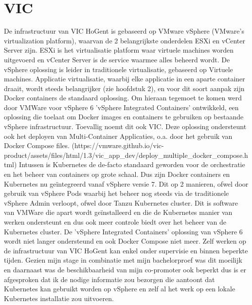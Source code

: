 \section{VIC}

De infrastructuur van VIC HoGent is gebaseerd op VMware vSphere (VMware's virtualization platform), waarvan de 2 belangrijkste onderdelen ESXi en vCenter Server zijn. ESXi is het virtualisatie platform waar virtuele machines worden uitgevoerd en vCenter Server is de service waarmee alles beheerd wordt.
\newline
\newline
De vSphere oplossing is leider in traditionele virtualisatie, gebaseerd op Virtuele machines. Applicatie virtualisatie, waarbij elke applicatie in een aparte container draait, wordt steeds belangrijker (zie hoofdstuk 2), en voor dit soort aanpak zijn Docker containers de standaard oplossing.
\newline
\newline
Om hieraan tegemoet te komen werd door VMWare voor vSphere 6 'vSphere Integrated Containers' ontwikkeld, een oplossing die toelaat om Docker images en containers te gebruiken op bestaande vSphere infrastructuur. Toevallig noemt dit ook VIC.
Deze oplossing ondersteunt ook het deployen van Multi-Container Applicaties, o.a. door het gebruik van Docker Compose files. (https://vmware.github.io/vic-product/assets/files/html/1.3/vic\_app\_dev/deploy\_multiple\_docker\_compose.html)
\newline
\newline
Intussen is Kubernetes de de-facto standaard geworden voor de orchestratie en het beheer van containers op grote schaal.
\newline
\newline
Dus zijn Docker containers en Kubernetes nu geïntegreerd vanaf vSphere versie 7. Dit op 2 manieren, ofwel door gebruik van vSphere Pods waarbij het beheer nog steeds via de traditionele vSphere Admin verloopt, ofwel door Tanzu Kubernetes cluster. Dit is software van VMWare die apart wordt geïnstalleerd en die de Kubernetes manier van werken ondersteunt en dus ook meer controle biedt over het beheer van de Kubernetes cluster.
De 'vSphere Integrated Containers' oplossing van vSphere 6 wordt niet langer ondersteund en ook Docker Compose niet meer.
\newline
\newline
Zelf werken op de infrastructuur van VIC HoGent kan enkel onder supervisie en binnen beperkte tijden. Gezien mijn stage in combinatie met mijn bachelorproef was dit moeilijk en daarnaast was de beschikbaarheid van mijn co-promoter ook beperkt dus is er afgesproken dat ik de nodige informatie zou bezorgen die aantoont dat Kubernetes kan gebruikt worden op vSphere en zelf al het werk op een lokale Kubernetes installatie zou uitvoeren.

